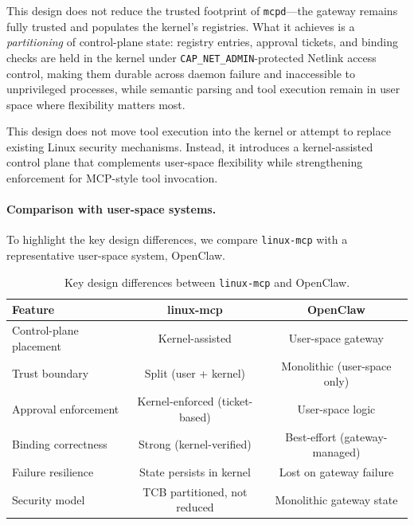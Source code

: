 This design does not reduce the trusted footprint of \texttt{mcpd}---the gateway remains fully trusted and populates the kernel's registries.
What it achieves is a \emph{partitioning} of control-plane state: registry entries, approval tickets, and binding checks are held in the kernel under \texttt{CAP\_NET\_ADMIN}-protected Netlink access control, making them durable across daemon failure and inaccessible to unprivileged processes, while semantic parsing and tool execution remain in user space where flexibility matters most.

This design does not move tool execution into the kernel or attempt to replace existing Linux security mechanisms. 
Instead, it introduces a kernel-assisted control plane that complements user-space flexibility while strengthening enforcement for MCP-style tool invocation.

\paragraph{Comparison with user-space systems.}
To highlight the key design differences, we compare \texttt{linux-mcp} with a representative user-space system, OpenClaw.

\begin{table}[t]
\centering
\small
\begin{tabular}{lcc}
\toprule
\textbf{Feature} & \textbf{linux-mcp} & \textbf{OpenClaw} \\
\midrule

Control-plane placement 
& Kernel-assisted 
& User-space gateway \\

Trust boundary 
& Split (user + kernel) 
& Monolithic (user-space only) \\

Approval enforcement 
& Kernel-enforced (ticket-based) 
& User-space logic \\

Binding correctness 
& Strong (kernel-verified) 
& Best-effort (gateway-managed) \\

Failure resilience 
& State persists in kernel 
& Lost on gateway failure \\

Security model
& TCB partitioned, not reduced
& Monolithic gateway state \\

\bottomrule
\end{tabular}
\caption{Key design differences between \texttt{linux-mcp} and OpenClaw.}
\label{tab:comparison}
\end{table}

